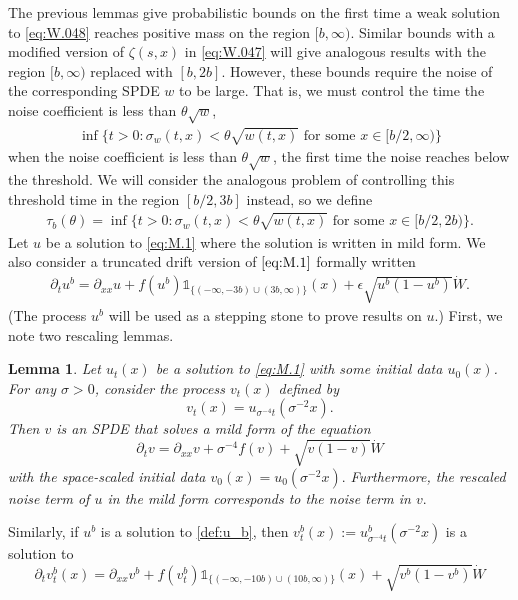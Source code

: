 \documentclass[12pt,a4paper]{amsart}
\numberwithin{equation}{section}
\theoremstyle{plain}
\newtheorem{lemma}[theorem]{Lemma}
\theoremstyle{remark}
\begin{document}
The previous lemmas give probabilistic bounds on the first time a weak solution to \eqref{eq:W.048} reaches positive mass on the region $[b, \infty).$ Similar bounds with a modified version of $\zeta(s, x)$ in \eqref{eq:W.047} will give analogous results with the region $[b, \infty)$ replaced with $[b, 2b].$ However, these bounds require the noise of the corresponding SPDE $w$ to be large. That is, we must control the time the noise coefficient is less than $\theta\sqrt{w}$,
\begin{align*}
\inf\{t > 0: \sigma_w(t, x) < \theta\sqrt{w(t, x)} \text{ for some } x \in [b/2, \infty) \}
\end{align*}
when the noise coefficient is less than $\theta\sqrt{w}$, the first time the noise reaches below the threshold. We will consider the analogous problem of controlling this threshold time in the region $[b/2, 3b]$ instead, so we define
\begin{align}
\tau_b(\theta) = \inf\big\{t > 0: \sigma_w(t, x) < \theta\sqrt{w(t, x)} \text{ for some } x \in [b/2, 2b) \big\}.
\end{align}
Let $u$ be a solution to \eqref{eq:M.1} where the solution is written in mild form.
We also consider a truncated drift version of $\eqref{eq:M.1}$ formally written
\begin{align}\label{def:u_b}
\partial_t u^b = \partial_{xx} u + f(u^b)\mathds{1}_{\{(-\infty, -3b) \cup (3b, \infty)\}}(x)+ \epsilon \sqrt{u^b(1-u^b)}\dot W.
\end{align}
(The process $u^b$ will be used as a stepping stone to prove results on $u.$)
First, we note two rescaling lemmas.
\begin{lemma}
Let $u_t(x)$ be a solution to \eqref{eq:M.1} with some initial data $u_0(x)$. For any $\sigma > 0$, consider the process $v_t(x)$ defined by
\[
v_t(x) = u_{\sigma^{-4}t}(\sigma^{-2}x).
\]
Then $v$ is an SPDE that solves a mild form of the equation
\[
\partial_t v = \partial_{xx} v + \sigma^{-4}f(v) + \sqrt{v(1- v)}\dot{W}
\]
with the space-scaled initial data $v_0(x) = u_0(\sigma^{-2}x).$
Furthermore, the rescaled noise term of $u$ in the mild form corresponds to the noise term in  $v.$
\end{lemma}

Similarly, if $u^b$ is a solution to \eqref{def:u_b}, then $v^b_t(x) := u^b_{\sigma^{-4}t}(\sigma^{-2}x)$ is a solution to 
\[
\partial_tv_t^b(x) = \partial_{xx}v^b + f(v_t^b)\mathds{1}_{\{(-\infty, -10b) \cup (10b, \infty)\}}(x) + \sqrt{v^b(1 - v^b)}\dot{W}
\]
\end{document}
